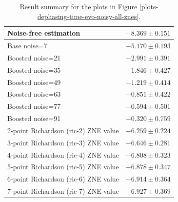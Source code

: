 \begin{table}
\caption{Result summary for the plots in Figure \ref{plots-dephasing-time-evo-noisy-all-znes}.}
\begin{tabular*}{\textwidth}{@{\extracolsep{\fill}}ll@{}}
\toprule

Noise-free estimation & $-8.369 \pm 0.151$ \\
\midrule
Base noise=7 & $-5.170 \pm 0.193$ \\
Boosted noise=21 & $-2.991 \pm 0.391$ \\
Boosted noise=35 & $-1.846 \pm 0.427$ \\
Boosted noise=49 & $-1.219 \pm 0.414$ \\
Boosted noise=63 & $-0.851 \pm 0.422$ \\
Boosted noise=77 & $-0.594 \pm 0.501$ \\
Boosted noise=91 & $-0.320 \pm 0.759$ \\
\midrule
2-point Richardson (ric-2) ZNE value & $-6.259 \pm 0.224$ \\
3-point Richardson (ric-3) ZNE value & $-6.646 \pm 0.281$ \\
4-point Richardson (ric-4) ZNE value & $-6.808 \pm 0.323$ \\
5-point Richardson (ric-5) ZNE value & $-6.878 \pm 0.347$ \\
6-point Richardson (ric-6) ZNE value & $-6.914 \pm 0.364$ \\
7-point Richardson (ric-7) ZNE value & $-6.927 \pm 0.369$ \\
\bottomrule
\end{tabular*}
\label{table-dephasing-noise-free-time-evo}
\end{table}
